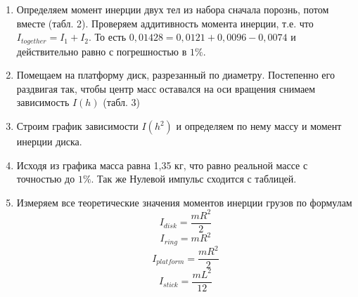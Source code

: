 \documentclass[a4paper, 12pt]{article}%
\begin{document}
\begin{enumerate}
\item Определяем момент инерции двух тел из набора сначала порознь, потом вместе (табл. 2). Проверяем аддитивность момента инерции, т.е. что $I_{together} = I_1 + I_2$. То есть $0,01428 = 0,0121
+ 0,0096 - 0,0074$ и действительно равно с погрешностью в $1 \%$.
\item Помещаем на платформу диск, разрезанный по диаметру. Постепенно его раздвигая так, чтобы центр масс оставался на оси вращения снимаем зависимость $I (h)$ (табл. 3)
\item Строим график зависимости $I(h^2)$ и определяем по нему массу и момент инерции диска.
\item Исходя из графика масса равна 1,35 кг, что равно реальной массе с точностью до $1 \%$. Так же Нулевой импульс сходится с таблицей.
\item Измеряем все теоретические значения моментов инерции грузов по формулам
\[I_{disk} = \dfrac{mR^2}{2} \]
\[I_{ring} = mR^2 \]
\[I_{platform} = \dfrac{mR^2}{2} \]
\[I_{stick} = \dfrac{mL^2}{12} \]
\end{enumerate}
\newpage
\end{document}
